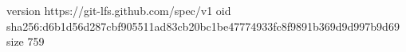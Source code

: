 version https://git-lfs.github.com/spec/v1
oid sha256:d6b1d56d287cbf905511ad83cb20bc1be47774933fc8f9891b369d9d997b9d69
size 759
